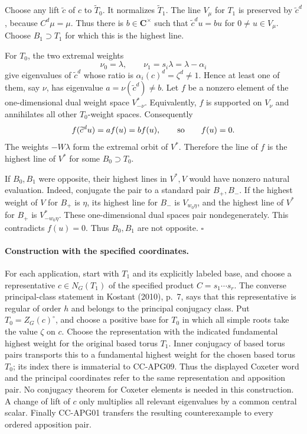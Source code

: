 Choose any lift \(\widetilde c\) of \(c\) to
\(\widetilde T_0\). It normalizes \(\widetilde T_1\).
The line \(V_\mu\) for \(T_1\) is preserved by
\(\widetilde c^d\), because \(C^d\mu=\mu\).
Thus there is \(b\in\mathbf C^\times\) such that
\(\widetilde c^d u=bu\) for \(0\ne u\in V_\mu\).
Choose \(B_1\supset T_1\) for which this is the highest line.

For \(T_0\), the two extremal weights
\[
               \nu_0=\lambda,\qquad
               \nu_1=s_i\lambda=\lambda-\alpha_i
\]
give eigenvalues of \(\widetilde c^d\) whose ratio is
\(\alpha_i(c)^d=\zeta^d\ne1\).
Hence at least one of them, say \(\nu\), has eigenvalue
\(a=\nu(\widetilde c^d)\ne b\).
Let \(f\) be a nonzero element of the one-dimensional dual weight
space \(V^*_{-\nu}\). Equivalently, \(f\) is supported on \(V_\nu\)
and annihilates all other \(T_0\)-weight spaces. Consequently
\[
       f(\widetilde c^d u)=a f(u)=b f(u),
                  \qquad\hbox{so}\qquad f(u)=0.
\]
The weights \(-W\lambda\) form the extremal orbit of \(V^*\).
Therefore the line of \(f\) is the highest line of \(V^*\) for
some \(B_0\supset T_0\).

If \(B_0,B_1\) were opposite, their highest lines in \(V^*,V\)
would have nonzero natural evaluation. Indeed, conjugate the
pair to a standard pair \(B_+,B_-\). If the highest weight of
\(V\) for \(B_+\) is \(\eta\), its highest line for \(B_-\)
is \(V_{w_0\eta}\), and the highest line of \(V^*\) for \(B_+\)
is \(V^*_{-w_0\eta}\). These one-dimensional dual spaces pair
nondegenerately. This contradicts \(f(u)=0\).
Thus \(B_0,B_1\) are not opposite. \(\square\)

\paragraph{Construction with the specified coordinates.}
For each application, start with \(T_1\) and its explicitly labeled
base, and choose a representative \(c\in N_G(T_1)\) of the
specified product \(C=s_1\cdots s_r\). The converse principal-class
statement in Kostant (2010), p.~7, says that this representative
is regular of order \(h\) and belongs to the principal conjugacy
class. Put \(T_0=Z_G(c)^\circ\), and choose a positive base for
\(T_0\) in which all simple roots take the value \(\zeta\) on \(c\).
Choose the representation with the indicated fundamental highest
weight for the original based torus \(T_1\). Inner conjugacy of
based torus pairs transports this to a fundamental highest weight
for the chosen based torus \(T_0\); its index there is immaterial
to CC-APG09. Thus the displayed Coxeter word and the principal
coordinates refer to the same representation and apposition pair.
No conjugacy theorem for Coxeter elements is needed in this
construction. A change of lift of \(c\) only multiplies all relevant
eigenvalues by a common central scalar. Finally CC-APG01 transfers
the resulting counterexample to every ordered apposition pair.

